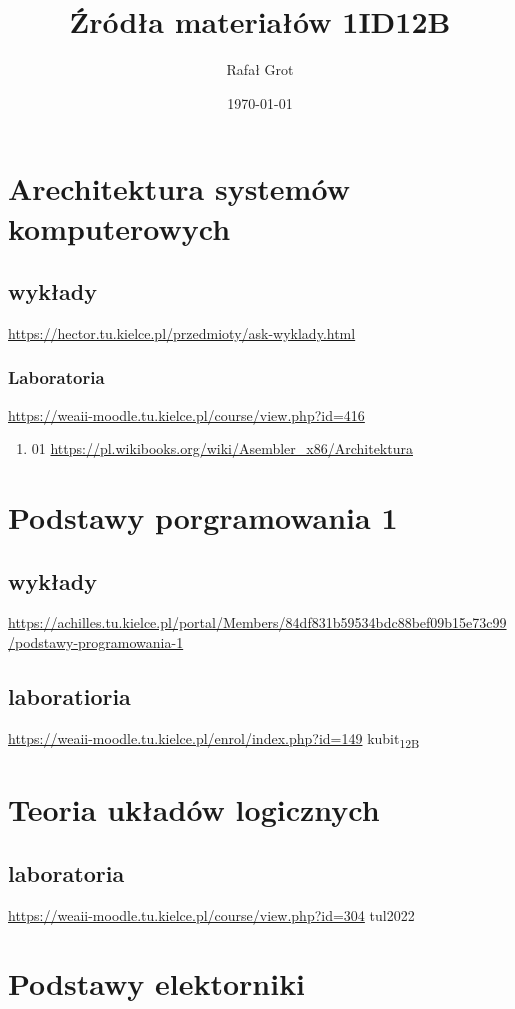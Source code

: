 \documentclass[11pt]{article}
\author{Rafał Grot}
\date{\today}
\title{Źródła materiałów 1ID12B}
\begin{document}
\maketitle
\tableofcontents


\section{Arechitektura systemów komputerowych}
\label{sec:orgb317969}
\subsection{wykłady}
\label{sec:org16f0f43}
\url{https://hector.tu.kielce.pl/przedmioty/ask-wyklady.html}
\subsubsection{Laboratoria}
\label{sec:orge9b26cf}
\url{https://weaii-moodle.tu.kielce.pl/course/view.php?id=416}
\begin{enumerate}
\item 01
\label{sec:orgb0c55dc}
\url{https://pl.wikibooks.org/wiki/Asembler\_x86/Architektura}
\end{enumerate}
\section{Podstawy porgramowania 1}
\label{sec:orgf913b80}
\subsection{wykłady}
\label{sec:orgbe136b3}
\url{https://achilles.tu.kielce.pl/portal/Members/84df831b59534bdc88bef09b15e73c99/podstawy-programowania-1}
\subsection{laboratioria}
\label{sec:orgd238546}
\url{https://weaii-moodle.tu.kielce.pl/enrol/index.php?id=149} kubit\textsubscript{12B}
\section{Teoria układów logicznych}
\label{sec:orgf90a6c8}
\subsection{laboratoria}
\label{sec:org25ab4c0}
\url{https://weaii-moodle.tu.kielce.pl/course/view.php?id=304} tul2022
\section{Podstawy elektorniki}
\label{sec:org222c5c0}
\end{document}
